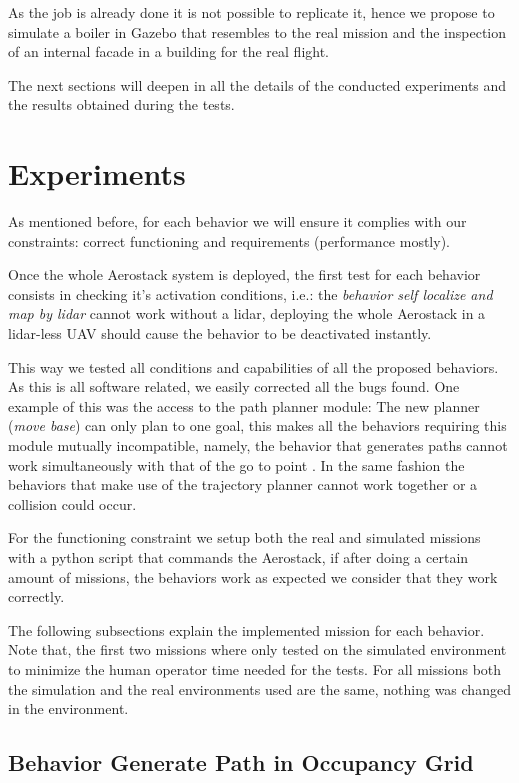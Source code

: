  As the job is already done it is not possible to replicate it, hence we propose to simulate a boiler in Gazebo that resembles to the real mission and the inspection of an internal facade in a building for the real flight.

  The next sections will deepen in all the details of the conducted experiments and the results obtained during the tests.

\section{Experiments} \label{ch_5:sect:experiments}

  As mentioned before, for each behavior we will ensure it complies with our constraints: correct functioning and requirements (performance mostly).
  
  Once the whole Aerostack system is deployed, the first test for each behavior consists in checking it's activation conditions, i.e.: the \textit{behavior self localize and map by lidar} cannot work without a lidar, deploying the whole Aerostack in a lidar-less UAV should cause the behavior to be deactivated instantly.

  This way we tested all conditions and capabilities of all the proposed behaviors. As this is all software related, we easily corrected all the bugs found. One example of this was the access to the path planner module: The new planner (\textit{move base}) can only plan to one goal, this makes all the behaviors requiring this module mutually incompatible, namely, the behavior that generates paths cannot work simultaneously with that of the go to point . In the same fashion the behaviors that make use of the trajectory planner cannot work together or a collision could occur.

  For the functioning constraint we setup both the real and simulated missions with a python script that commands the Aerostack, if after doing a certain amount of missions, the behaviors work as expected we consider that they work correctly. 
  
  The following subsections explain the implemented mission for each behavior. Note that, the first two missions where only tested on the simulated environment to minimize the human operator time needed for the tests. For all missions both the simulation and the real environments used are the same, nothing was changed in the environment.

  \subsection{Behavior Generate Path in Occupancy Grid} \label{ch_5:subsect:behav_genpath_mission}

